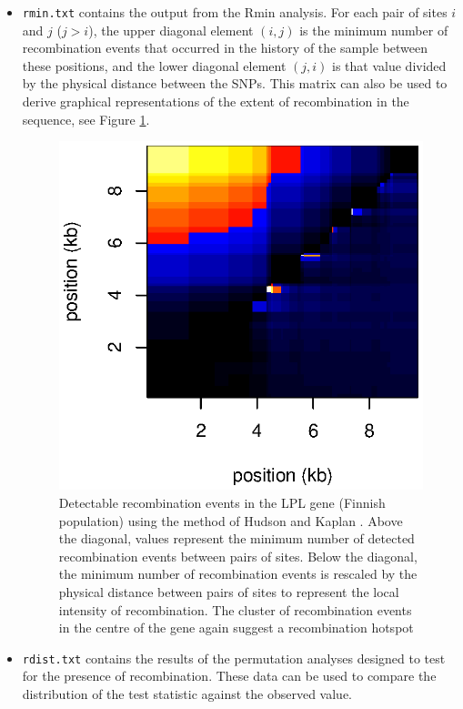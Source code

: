 \documentclass[a4paper,10pt,fullpage]{article}
\begin{document}
\begin{itemize}
\item {\verb+rmin.txt+} contains the output from the Rmin analysis.
For each pair of sites $i$ and $j$ ($j>i$), the upper diagonal
element $(i,j)$ is the minimum number of recombination events that
occurred in the history of the sample between these positions, and
the lower diagonal element $(j,i)$ is that value divided by the
physical distance between the SNPs.  This matrix can also be used
to derive graphical representations of the extent of recombination
in the sequence, see Figure \ref{fig:lpl_rmin}.

\begin{figure}
\linespread{1.3} \centering
\includegraphics[scale=1.0]{LPLrmin.eps}
\caption{Detectable recombination events in the LPL gene (Finnish
population) using the method of Hudson and Kaplan
\cite{HudsonKaplan85}.  Above the diagonal, values represent the
minimum number of detected recombination events between pairs of
sites. Below the diagonal, the minimum number of recombination
events is rescaled by the physical distance between pairs of sites
to represent the local intensity of recombination.  The cluster of
recombination events in the centre of the gene again suggest a
recombination hotspot} \label{fig:lpl_rmin}
\end{figure}

\item {\verb+rdist.txt+} contains the results of the permutation
analyses designed to test for the presence of recombination. These
data can be used to compare the distribution of the test statistic
against the observed value.


\end{itemize}
\end{document}
